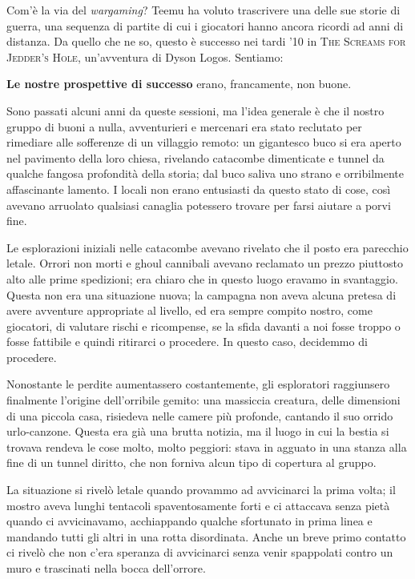 
Com'è la via del \textit{wargaming}? Teemu ha voluto trascrivere una delle sue storie di guerra, una sequenza di partite di cui i giocatori hanno ancora ricordi ad anni di distanza. Da quello che ne so, questo è successo nei tardi '10 in \textsc{The Screams for Jedder's Hole}, un'avventura di Dyson Logos. Sentiamo:

\textbf{Le nostre prospettive di successo} erano, francamente, non buone.

Sono passati alcuni anni da queste sessioni, ma l'idea generale è che il nostro gruppo di buoni a nulla, avventurieri e mercenari era stato reclutato per rimediare alle sofferenze di un villaggio remoto: un gigantesco buco si era aperto nel pavimento della loro chiesa, rivelando catacombe dimenticate e tunnel da qualche fangosa profondità della storia; dal buco saliva uno strano e orribilmente affascinante lamento. I locali non erano entusiasti da questo stato di cose, così avevano arruolato qualsiasi canaglia potessero trovare per farsi aiutare a porvi fine.

Le esplorazioni iniziali nelle catacombe avevano rivelato che il posto era parecchio letale. Orrori non morti e ghoul cannibali avevano reclamato un prezzo piuttosto alto alle prime spedizioni; era chiaro che in questo luogo eravamo in svantaggio. Questa non era una situazione nuova; la campagna non aveva alcuna pretesa di avere avventure appropriate al livello, ed era sempre compito nostro, come giocatori, di valutare rischi e ricompense, se la sfida davanti a noi fosse troppo o fosse fattibile e quindi ritirarci o procedere. In questo caso, decidemmo di procedere.

Nonostante le perdite aumentassero costantemente, gli esploratori raggiunsero finalmente l'origine dell'orribile gemito: una massiccia creatura, delle dimensioni di una piccola casa, risiedeva nelle camere più profonde, cantando il suo orrido urlo-canzone. Questa era già una brutta notizia, ma il luogo in cui la bestia si trovava rendeva le cose molto, molto peggiori: stava in agguato in una stanza alla fine di un tunnel diritto, che non forniva alcun tipo di copertura al gruppo.

La situazione si rivelò letale quando provammo ad avvicinarci la prima volta; il mostro aveva lunghi tentacoli spaventosamente forti e ci attaccava senza pietà quando ci avvicinavamo, acchiappando qualche sfortunato in prima linea e mandando tutti gli altri in una rotta disordinata. Anche un breve primo contatto ci rivelò che non c'era speranza di avvicinarci senza venir spappolati contro un muro e trascinati nella bocca dell'orrore.

